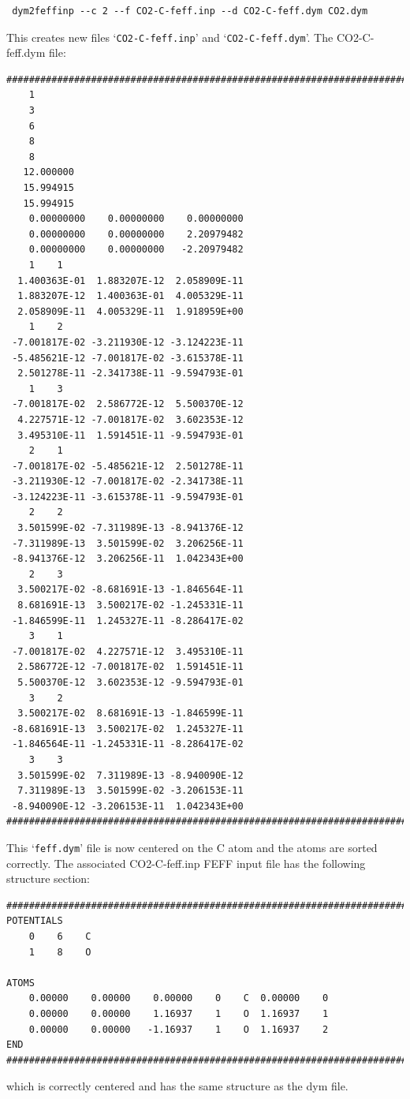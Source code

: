 \documentclass[11pt,oneside]{report} %
\newcommand{\file}[1]{`\texttt{#1}'}
\begin{document}
\begin{verbatim} dym2feffinp --c 2 --f CO2-C-feff.inp --d CO2-C-feff.dym CO2.dym 
\end{verbatim}

This creates new files \file{CO2-C-feff.inp} and \file{CO2-C-feff.dym}.  The CO2-C-feff.dym file:
\begin{verbatim}
###############################################################################
    1
    3
    6
    8
    8
   12.000000
   15.994915
   15.994915
    0.00000000    0.00000000    0.00000000
    0.00000000    0.00000000    2.20979482
    0.00000000    0.00000000   -2.20979482
    1    1
  1.400363E-01  1.883207E-12  2.058909E-11
  1.883207E-12  1.400363E-01  4.005329E-11
  2.058909E-11  4.005329E-11  1.918959E+00
    1    2
 -7.001817E-02 -3.211930E-12 -3.124223E-11
 -5.485621E-12 -7.001817E-02 -3.615378E-11
  2.501278E-11 -2.341738E-11 -9.594793E-01
    1    3
 -7.001817E-02  2.586772E-12  5.500370E-12
  4.227571E-12 -7.001817E-02  3.602353E-12
  3.495310E-11  1.591451E-11 -9.594793E-01
    2    1
 -7.001817E-02 -5.485621E-12  2.501278E-11
 -3.211930E-12 -7.001817E-02 -2.341738E-11
 -3.124223E-11 -3.615378E-11 -9.594793E-01
    2    2
  3.501599E-02 -7.311989E-13 -8.941376E-12
 -7.311989E-13  3.501599E-02  3.206256E-11
 -8.941376E-12  3.206256E-11  1.042343E+00
    2    3
  3.500217E-02 -8.681691E-13 -1.846564E-11
  8.681691E-13  3.500217E-02 -1.245331E-11
 -1.846599E-11  1.245327E-11 -8.286417E-02
    3    1
 -7.001817E-02  4.227571E-12  3.495310E-11
  2.586772E-12 -7.001817E-02  1.591451E-11
  5.500370E-12  3.602353E-12 -9.594793E-01
    3    2
  3.500217E-02  8.681691E-13 -1.846599E-11
 -8.681691E-13  3.500217E-02  1.245327E-11
 -1.846564E-11 -1.245331E-11 -8.286417E-02
    3    3
  3.501599E-02  7.311989E-13 -8.940090E-12
  7.311989E-13  3.501599E-02 -3.206153E-11
 -8.940090E-12 -3.206153E-11  1.042343E+00
###############################################################################
\end{verbatim}

This \file{feff.dym} file is now centered on the C atom and the atoms are sorted correctly.
The associated CO2-C-feff.inp FEFF input file has the following structure
section:
\begin{verbatim}
###############################################################################
POTENTIALS
    0    6    C
    1    8    O

ATOMS
    0.00000    0.00000    0.00000    0    C  0.00000    0
    0.00000    0.00000    1.16937    1    O  1.16937    1
    0.00000    0.00000   -1.16937    1    O  1.16937    2
END
###############################################################################
\end{verbatim}
which is correctly centered and has the same structure as the dym file.
\end{document}
